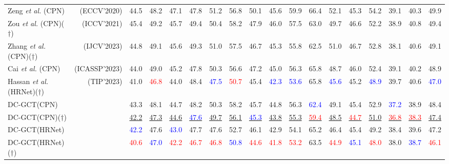 \documentclass[journal]{IEEEtran}
\begin{document}
\begin{table*}[htbp]
{\begin{tabular}{lr|ccccccccccccccc|c}
Zeng \textit{et al.} \cite{zeng2020srnet}(CPN) &(ECCV'2020) &44.5 &48.2 &47.1 &47.8 &51.2 &56.8 &50.1 &45.6 &59.9 &66.4 &52.1 &45.3 &54.2 &39.1 &40.3 &49.9 \\ 
Zou \textit{et al.} \cite{zou2021modulated}(CPN)($\dagger$) &(ICCV'2021) &45.4 &49.2 &45.7 &49.4 &50.4 &58.2 &47.9 &46.0 &57.5 &63.0 &49.7 &46.6 &52.2 &38.9 &40.8 &49.4 \\

Zhang \textit{et al.} \cite{zhang2023learning}(CPN)($\dagger$) &(IJCV'2023) &44.8 &49.1 &45.6 &49.3 &51.0 &57.5 &46.7 &45.3 &55.8 &62.5 &51.0 &46.7 &52.8 &38.1 &40.6 &49.1 \\



Cai \textit{et al.} \cite{cai2023htnet}(CPN) &(ICASSP'2023) &44.0 &49.0 &45.2 &47.8 &50.3 &56.6 &47.2 &45.0 &56.3 &65.8 &48.7 &46.0 &52.4 &39.1 &40.2 &48.9 \\

Hassan \textit{et al.} \cite{hassan2023regular}(HRNet)($\dagger$) &(TIP'2023) &41.0 &\textcolor{red}{46.8} &44.0 &48.4 &\textcolor{blue}{47.5} &\textcolor{red}{50.7} &45.4 &\textcolor{blue}{42.3} &\textcolor{blue}{53.6} &65.8 &\textcolor{blue}{45.6} &45.2 &\textcolor{blue}{48.9} &39.7 &40.6 &\textcolor{blue}{47.0}\\

\hline

DC-GCT(CPN) &                        &43.3 &48.1 &44.7 &48.2 &50.3 &58.2 &45.7 &44.8 &56.3 &\textcolor{blue}{62.4} &49.1 &45.4 &52.9 &\textcolor{blue}{37.2} &38.9 &48.4 \\
DC-GCT(CPN)($\dagger$)  &            &\underline{42.2} &\underline{47.3} &\underline{44.6} &\underline{\textcolor{blue}{47.6}} &\underline{49.7} &\underline{56.1} &\underline{\textcolor{blue}{45.3}} &\underline{43.8} &\underline{55.3} &\underline{\textcolor{red}{59.4}} &\underline{48.5} &\underline{\textcolor{red}{44.7}} &\underline{51.0} &\underline{\textcolor{red}{36.8}} &\underline{\textcolor{red}{38.3}} &\underline{47.4} \\

DC-GCT(HRNet) &                        &\textcolor{blue}{42.2} &47.6 &\textcolor{blue}{43.0} &47.7 &47.6 &52.7 &46.1 &42.9 &54.1 &65.2 &46.4 &45.4 &49.2 &38.4 &39.6 &47.2 \\
DC-GCT(HRNet)($\dagger$)  &            &\textcolor{red}{40.6} &\textcolor{blue}{47.0} &\textcolor{red}{42.2} &\textcolor{red}{46.7} &\textcolor{red}{46.8} &\textcolor{blue}{50.8} &\textcolor{red}{44.6} &\textcolor{red}{41.8} &\textcolor{red}{53.2} &63.5 &\textcolor{red}{44.9} &\textcolor{blue}{45.1} &\textcolor{red}{48.0} &38.0 &\textcolor{blue}{38.7} &\textcolor{red}{46.1} \\


\end{tabular}}
\end{table*}
\end{document}
